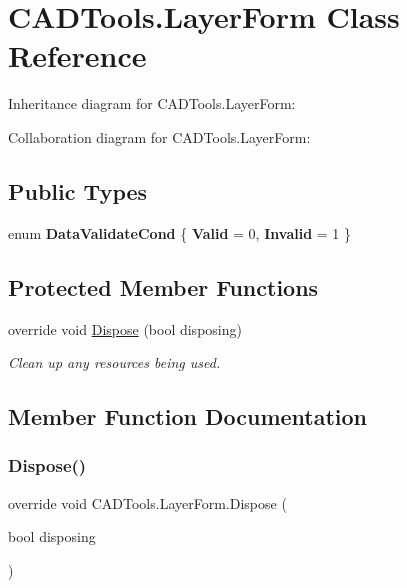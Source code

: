 \hypertarget{class_c_a_d_tools_1_1_layer_form}{}\section{C\+A\+D\+Tools.\+Layer\+Form Class Reference}
\label{class_c_a_d_tools_1_1_layer_form}


Inheritance diagram for C\+A\+D\+Tools.\+Layer\+Form\+:


Collaboration diagram for C\+A\+D\+Tools.\+Layer\+Form\+:
\subsection*{Public Types}
\begin{DoxyCompactItemize}
\item 
\mbox{\label{class_c_a_d_tools_1_1_layer_form_a95e4bb0465993fb98c5ba4c374c96d53}} 
enum {\bfseries Data\+Validate\+Cond} \{ {\bfseries Valid} = 0, 
{\bfseries Invalid} = 1
 \}
\end{DoxyCompactItemize}
\subsection*{Protected Member Functions}
\begin{DoxyCompactItemize}
\item 
override void \mbox{\hyperlink{class_c_a_d_tools_1_1_layer_form_afff2a947f2b634367cfa080c02739932}{Dispose}} (bool disposing)
\begin{DoxyCompactList}\small\item\em Clean up any resources being used. \end{DoxyCompactList}\end{DoxyCompactItemize}


\subsection{Member Function Documentation}
\mbox{\label{class_c_a_d_tools_1_1_layer_form_afff2a947f2b634367cfa080c02739932}} 
\subsubsection{\texorpdfstring{Dispose()}{Dispose()}}
{\footnotesize\ttfamily override void C\+A\+D\+Tools.\+Layer\+Form.\+Dispose (\begin{DoxyParamCaption}\item[{bool}]{disposing }\end{DoxyParamCaption})\hspace{0.3cm}{\ttfamily [protected]}}



